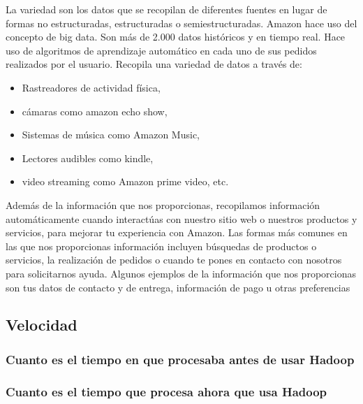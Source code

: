 La variedad son los datos que se recopilan de diferentes fuentes en lugar de formas no estructuradas, estructuradas o semiestructuradas. Amazon hace uso del concepto de big data. Son más de 2.000 datos históricos y en tiempo real. Hace uso de algoritmos de aprendizaje automático en cada uno de sus pedidos realizados por el usuario. Recopila una variedad de datos a través de:

\begin{itemize}
	\item Rastreadores de actividad física, 
	\item cámaras como amazon echo show, 
	\item Sistemas de música como Amazon Music, 
	\item Lectores audibles como kindle, 
	\item video streaming como Amazon prime video, etc.
\end{itemize}

Además de la información que nos proporcionas, recopilamos información automáticamente cuando interactúas con nuestro sitio web o nuestros productos y servicios, para mejorar tu experiencia con Amazon.
Las formas más comunes en las que nos proporcionas información incluyen búsquedas de productos o servicios, la realización de pedidos o cuando te pones en contacto con nosotros para solicitarnos ayuda. Algunos ejemplos de la información que nos proporcionas son tus datos de contacto y de entrega, información de pago u otras preferencias 


\clearpage
\subsection{Velocidad}

\subsubsection{Cuanto es el tiempo en que procesaba antes de usar Hadoop}
\lipsum[1] %

\subsubsection{Cuanto es el tiempo que procesa ahora que usa Hadoop}


